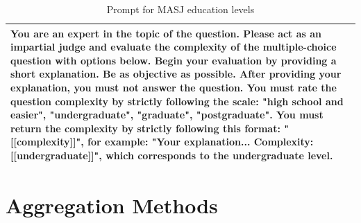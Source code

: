 \begin{table}[H]
\small
\centering
\begin{tabularx}{\linewidth}{X}
\hline
You are an expert in the topic of the question. Please act as an impartial judge and evaluate the complexity of the multiple-choice question with options below. Begin your evaluation by providing a short explanation. Be as objective as possible. After providing your explanation, you must not answer the question. You must rate the question complexity by strictly following the scale: "high school and easier", "undergraduate", "graduate", "postgraduate". You must return the complexity by strictly following this format: "[[complexity]]", for example: "Your explanation... Complexity: [[undergraduate]]", which corresponds to the undergraduate level.
\\
\hline 
\end{tabularx}
\caption{Prompt for MASJ education levels}
\label{tab:prompt_masj_edu_levels}
\end{table}


\section{Aggregation Methods}
\label{sec:aggr_methods}

